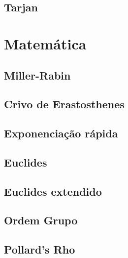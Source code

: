 \documentclass[12pt, a4paper, twoside]{article}
\begin{document}
\subsection{Tarjan}




%
%

\section{Matemática}

\subsection{Miller-Rabin}


\subsection{Crivo de Erastosthenes}


\subsection{Exponenciação rápida}


\subsection{Euclides}


\subsection{Euclides extendido}


\subsection{Ordem Grupo}


\subsection{Pollard's Rho}

\end{document}
